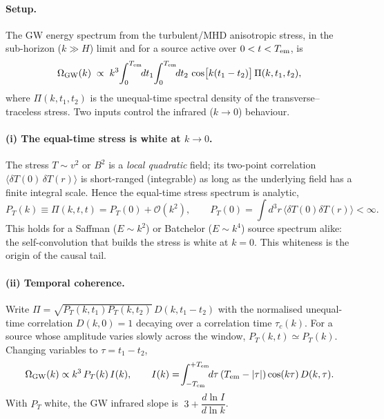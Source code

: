 
\paragraph{Setup.}
The GW energy spectrum from the turbulent/MHD anisotropic stress, in the sub-horizon
($k\gg H$) limit and for a source active over $0<t<T_{\rm em}$, is
\begin{equation}
  \Omega_{\rm GW}(k)\;\propto\; k^{3}\!\int_{0}^{T_{\rm em}}\!\!dt_1\!\int_{0}^{T_{\rm em}}\!\!dt_2\,
  \cos\!\big[k(t_1-t_2)\big]\,\Pi(k,t_1,t_2),
  \label{eq:master}
\end{equation}
where $\Pi(k,t_1,t_2)$ is the unequal-time spectral density of the transverse--traceless stress.
Two inputs control the infrared ($k\to0$) behaviour.

\paragraph{(i) The equal-time stress is white at $k\to0$.}
The stress $T\sim v^2$ or $B^2$ is a \emph{local quadratic} field; its two-point correlation
$\langle\delta T(0)\,\delta T(r)\rangle$ is short-ranged (integrable) as long as the underlying
field has a finite integral scale. Hence the equal-time stress spectrum is analytic,
\begin{equation}
  P_T(k)\equiv\Pi(k,t,t)=P_T(0)+\mathcal{O}(k^2),\qquad
  P_T(0)=\!\int\! d^3r\,\langle\delta T(0)\delta T(r)\rangle<\infty .
  \label{eq:white}
\end{equation}
This holds for a Saffman ($E\sim k^2$) or Batchelor ($E\sim k^4$) source spectrum alike: the
self-convolution that builds the stress is white at $k=0$. This whiteness is the origin of the
causal tail.

\paragraph{(ii) Temporal coherence.}
Write $\Pi=\sqrt{P_T(k,t_1)P_T(k,t_2)}\,D(k,t_1-t_2)$ with the normalised unequal-time
correlation $D(k,0)=1$ decaying over a correlation time $\tau_c(k)$. For a source whose amplitude
varies slowly across the window, $P_T(k,t)\simeq P_T(k)$. Changing variables to $\tau=t_1-t_2$,
\begin{equation}
  \Omega_{\rm GW}(k)\propto k^3\,P_T(k)\,I(k),\qquad
  I(k)=\!\int_{-T_{\rm em}}^{+T_{\rm em}}\!\! d\tau\,(T_{\rm em}-|\tau|)\cos(k\tau)\,D(k,\tau).
  \label{eq:window}
\end{equation}
With $P_T$ white, the GW infrared slope is $\;3+\dfrac{d\ln I}{d\ln k}$.

